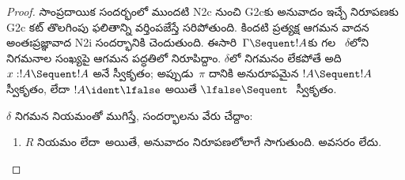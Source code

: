 \documentclass[../../../include/open-logic-section]{subfiles}
\begin{document}
\begin{proof}
సాంప్రదాయిక సందర్భంలో ముందటి N2c నుంచి G2cకు అనువాదం ఇచ్చే నిరూపణకు G2c కట్ తొలగింపు ఫలితాన్ని వర్తింపజేస్తే సరిపోతుంది. కిందటి ప్రత్యక్ష ఆగమన వాదన అంతఃప్రజ్ఞావాద N2i సందర్భానికి చెందుతుంది.
ఈసారి~$\Gamma \Sequent !A$కు గల ~$\delta$లోని నిగమనాల సంఖ్యపై ఆగమన పద్ధతిలో నిరూపిద్దాం. $\delta$లో నిగమనం లేకపోతే అది $x:!A \Sequent !A$ అనే స్వీకృతం; అప్పుడు~$\pi$ దానికి అనురూపమైన $!A \Sequent !A$ స్వీకృతం, లేదా $!A
\ident \lfalse$ అయితే $\lfalse \Sequent \ $ స్వీకృతం.

$\delta$ నిగమన నియమంతో ముగిస్తే, సందర్భాలను వేరు చేద్దాం:
\begin{enumerate}
  \item $R$  నియమం లేదా~\FalseInt అయితే, అనువాదం  నిరూపణలోలాగే సాగుతుంది. \Cut{} అవసరం లేదు.


\end{enumerate}
\end{proof}
\end{document}

